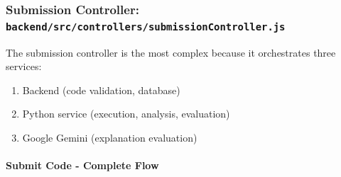 \documentclass[12pt,a4paper,oneside]{article}
\newcommand{\fileref}[1]{\texttt{#1}}
\begin{document}
\subsubsection{Submission Controller: \fileref{backend/src/controllers/submissionController.js}}

The submission controller is the most complex because it orchestrates three services:

\begin{enumerate}
    \item Backend (code validation, database)
    \item Python service (execution, analysis, evaluation)
    \item Google Gemini (explanation evaluation)
\end{enumerate}

\paragraph{Submit Code - Complete Flow}
\end{document}
